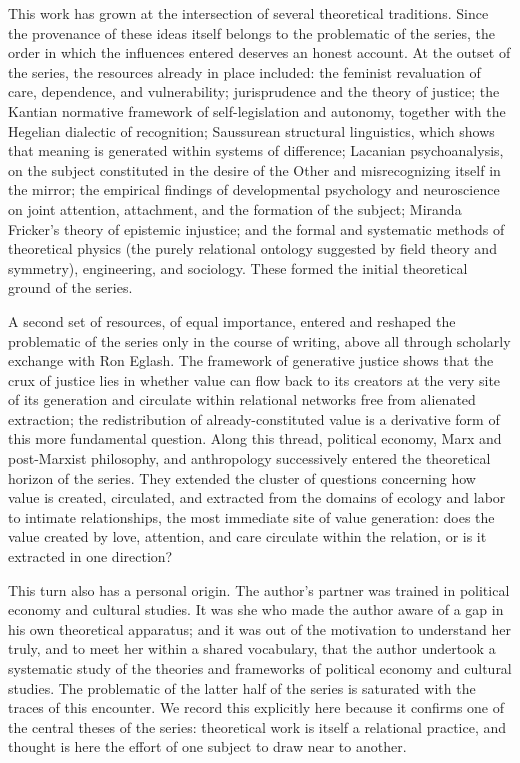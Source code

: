 \documentclass[11pt]{book}
\begin{document}
This work has grown at the intersection of several theoretical traditions. Since the provenance of these ideas itself belongs to the problematic of the series, the order in which the influences entered deserves an honest account. At the outset of the series, the resources already in place included: the feminist revaluation of care, dependence, and vulnerability; jurisprudence and the theory of justice; the Kantian normative framework of self-legislation and autonomy, together with the Hegelian dialectic of recognition; Saussurean structural linguistics, which shows that meaning is generated within systems of difference; Lacanian psychoanalysis, on the subject constituted in the desire of the Other and misrecognizing itself in the mirror; the empirical findings of developmental psychology and neuroscience on joint attention, attachment, and the formation of the subject; Miranda Fricker's theory of epistemic injustice; and the formal and systematic methods of theoretical physics (the purely relational ontology suggested by field theory and symmetry), engineering, and sociology. These formed the initial theoretical ground of the series.

A second set of resources, of equal importance, entered and reshaped the problematic of the series only in the course of writing, above all through scholarly exchange with Ron Eglash. The framework of generative justice shows that the crux of justice lies in whether value can flow back to its creators at the very site of its generation and circulate within relational networks free from alienated extraction; the redistribution of already-constituted value is a derivative form of this more fundamental question. Along this thread, political economy, Marx and post-Marxist philosophy, and anthropology successively entered the theoretical horizon of the series. They extended the cluster of questions concerning how value is created, circulated, and extracted from the domains of ecology and labor to intimate relationships, the most immediate site of value generation: does the value created by love, attention, and care circulate within the relation, or is it extracted in one direction?

This turn also has a personal origin. The author's partner was trained in political economy and cultural studies. It was she who made the author aware of a gap in his own theoretical apparatus; and it was out of the motivation to understand her truly, and to meet her within a shared vocabulary, that the author undertook a systematic study of the theories and frameworks of political economy and cultural studies. The problematic of the latter half of the series is saturated with the traces of this encounter. We record this explicitly here because it confirms one of the central theses of the series: theoretical work is itself a relational practice, and thought is here the effort of one subject to draw near to another.
\end{document}
